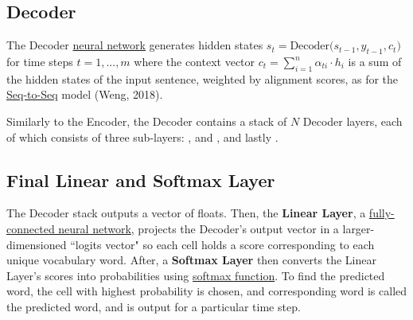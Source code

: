 \subsection{Decoder} \label{sec:TransformerDecoder}


The Decoder \hyperref[sec:NeuralLM]{neural network} generates hidden states $s_t = \text{Decoder}\Big( s_{t-1}, y_{t-1}, c_t \Big)$ for time steps $t = 1,..., m$ where the context vector $c_t = \sum_{i=1}^n \alpha_{ti} \cdot h_i$ is a sum of the hidden states of the input sentence, weighted by alignment scores, as for the \hyperref[sec:Seq2Seq]{Seq-to-Seq} model (Weng, 2018). 

Similarly to the Encoder, the Decoder contains a stack of $N$ Decoder layers, each of which consists of three sub-layers: \textbf{}, and \textbf{}, and lastly \textbf{ }. 





\subsection{Final Linear and Softmax Layer} \label{sec:TransformerFinalLayer}


The Decoder stack outputs a vector of floats. Then, the \textbf{Linear Layer}, a \hyperref[sec:NeuralLM]{fully-connected neural network}, projects the Decoder's output vector in a larger-dimensioned ``logits vector" so each cell holds a score corresponding to each unique vocabulary word. After, a \textbf{Softmax Layer} then converts the Linear Layer's scores into probabilities using \hyperref[cnc:softmaxLayer]{softmax function}. To find the predicted word, the cell with highest probability is chosen, and corresponding word is called the predicted word, and is output for a particular time step.



